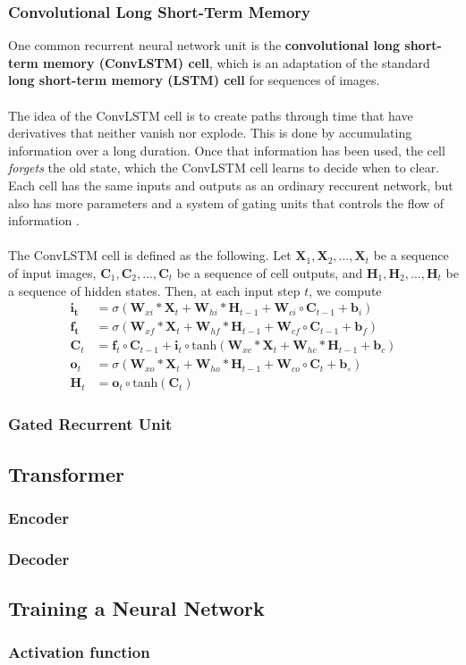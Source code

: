 \documentclass[./main.tex]{subfiles}
\begin{document}
\subsubsection{Convolutional Long Short-Term Memory}
One common recurrent neural network unit is the \textbf{convolutional long short-term memory (ConvLSTM) cell}, which is an adaptation of the standard \textbf{long short-term memory (LSTM) cell} for sequences of images. 
\\
\\
\noindent The idea of the ConvLSTM cell is to create paths through time that have derivatives that neither vanish nor explode. This is done by accumulating information over a long duration. Once that information has been used, the cell \textit{forgets} the old state, which the ConvLSTM cell learns to decide when to clear. Each cell has the same inputs and outputs as an ordinary reccurent network, but also has more parameters and a system of gating units that controls the flow of information \cite{DL_book}.
\\
\\
The ConvLSTM cell is defined as the following. Let $\bm{X}_1, \bm{X}_2, ..., \bm{X}_t$ be a sequence of input images, $\bm{C}_1, \bm{C}_2, ..., \bm{C}_t$ be a sequence of cell outputs, and $\bm{H}_1, \bm{H}_2, ..., \bm{H}_t$ be a sequence of hidden states. Then, at each input step $t$, we compute \cite{conv_lstm}
\begin{align}
    \bm{i_t} &= \sigma \left( \bm{W}_{xi} * \bm{X}_t + \bm{W}_{hi} * \bm{H}_{t - 1} + \bm{W}_{ci} \circ \bm{C}_{t - 1} + \bm{b}_i \right) \\
    \bm{f_t} &= \sigma \left( \bm{W}_{xf} * \bm{X}_t + \bm{W}_{hf} * \bm{H}_{t - 1} + \bm{W}_{cf} \circ \bm{C}_{t - 1} + \bm{b}_f \right) \\
    \bm{C}_t &= \bm{f}_t \circ \bm{C}_{t - 1} + \bm{i}_t \circ \text{tanh} \left( \bm{W}_{xc} * \bm{X}_t + \bm{W}_{hc} * \bm{H}_{t - 1} + \bm{b}_c \right) \\
    \bm{o}_t &= \sigma \left( \bm{W}_{xo} * \bm{X}_t + \bm{W}_{ho} * \bm{H}_{t - 1} + \bm{W}_{co} \circ \bm{C}_t + \bm{b}_\circ \right) \\
    \bm{H}_t &= \bm{o}_t \circ \text{tanh}(\bm{C}_t)
\end{align}

\subsubsection{Gated Recurrent Unit}


\subsection{Transformer}
\subsubsection{Encoder}
\subsubsection{Decoder}

\subsection{Training a Neural Network}
\subsubsection{Activation function}
\label{subsubsec:activation_func}
\end{document}
